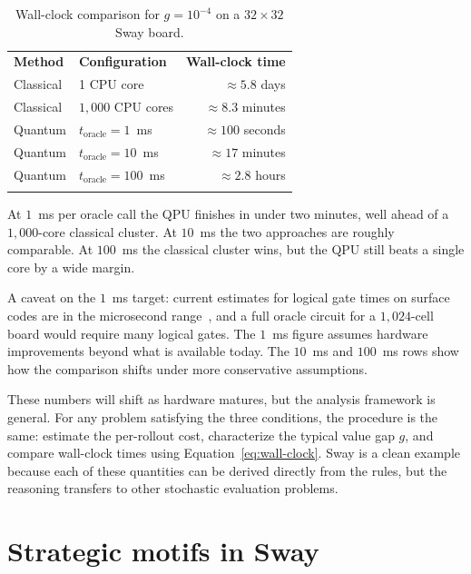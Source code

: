 \begin{table}[ht]
  \centering
  \setlength{\tabcolsep}{0.8em}
  \caption{Wall-clock comparison for $g = 10^{-4}$ on a $32 \times 32$ Sway board.}
  \label{tab:numerical-example}
  \begin{tabular}{@{}llr@{}}
    \hline\noalign{\smallskip}
    \textbf{Method} & \textbf{Configuration} & \textbf{Wall-clock time} \\
    \noalign{\smallskip}\hline\noalign{\smallskip}
    Classical & 1 CPU core & $\approx 5.8$ days \\
    Classical & $1{,}000$ CPU cores & $\approx 8.3$ minutes \\
    \noalign{\smallskip}\hline\noalign{\smallskip}
    Quantum & $t_{\text{oracle}} = 1$~ms & $\approx 100$ seconds \\
    Quantum & $t_{\text{oracle}} = 10$~ms & $\approx 17$ minutes \\
    Quantum & $t_{\text{oracle}} = 100$~ms & $\approx 2.8$ hours \\
    \noalign{\smallskip}\hline
  \end{tabular}
\end{table}

At $1$~ms per oracle call the QPU finishes in under two minutes, well ahead of a $1{,}000$-core classical cluster.
At $10$~ms the two approaches are roughly comparable.
At $100$~ms the classical cluster wins, but the QPU still beats a single core by a wide margin.

A caveat on the $1$~ms target: current estimates for logical gate times on surface codes are in the microsecond range~\cite{fowler2012}, and a full oracle circuit for a $1{,}024$-cell board would require many logical gates.
The $1$~ms figure assumes hardware improvements beyond what is available today.
The $10$~ms and $100$~ms rows show how the comparison shifts under more conservative assumptions.

These numbers will shift as hardware matures, but the analysis framework is general.
For any problem satisfying the three conditions, the procedure is the same: estimate the per-rollout cost, characterize the typical value gap $g$, and compare wall-clock times using Equation~\ref{eq:wall-clock}.
Sway is a clean example because each of these quantities can be derived directly from the rules, but the reasoning transfers to other stochastic evaluation problems.

\section{Strategic motifs in Sway}

